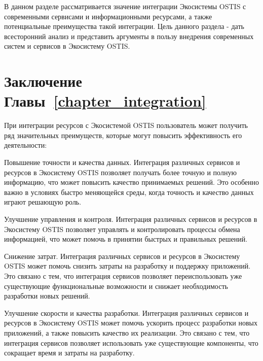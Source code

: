 В данном разделе рассматривается значение интеграции Экосистемы OSTIS с современными сервисами и информационными ресурсами, а также потенциальные преимущества такой интеграции. 
Цель данного раздела - дать всесторонний анализ и представить аргументы в пользу внедрения современных систем и сервисов в Экосистему OSTIS.






%
\section*{Заключение Главы~\ref{chapter_integration}}

При интеграции ресурсов с Экосистемой OSTIS пользователь может получить ряд значительных преимуществ, которые могут повысить эффективность его деятельности:
\begin{textitemize}
	\item Повышение точности и качества данных. Интеграция различных сервисов и ресурсов в Экосистему OSTIS позволяет получать более точную и полную информацию, что может повысить качество принимаемых решений. Это особенно важно в условиях быстро меняющейся среды, когда точность и качество данных играют решающую роль.
	\item Улучшение управления и контроля. Интеграция различных сервисов и ресурсов в Экосистему OSTIS позволяет управлять и контролировать процессы обмена информацией, что может помочь в принятии быстрых и правильных решений.
	\item Снижение затрат. Интеграция различных сервисов и ресурсов в Экосистему OSTIS может помочь снизить затраты на разработку и поддержку приложений. Это связано с тем, что интеграция сервисов позволяет переиспользовать уже существующие функциональные возможности и снижает необходимость разработки новых решений.
	\item Улучшение скорости и качества разработки. Интеграция различных сервисов и ресурсов в Экосистему OSTIS может помочь ускорить процесс разработки новых приложений, а также повысить качество их реализации. Это связано с тем, что интеграция сервисов позволяет использовать уже существующие компоненты, что сокращает время и затраты на разработку.
\end{textitemize}